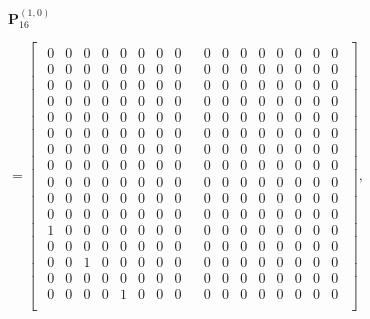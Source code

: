 \documentclass{jtacs}
\numberwithin{equation}{section}
\begin{document}
\begin{center}
$\mathbf{P}_{16}^{(1,0)}$
\begin{adjustbox}{width=0.55\textwidth, margin= 0 0}
$
=\left[
\begin{array}{cc}
\begin{matrix}
0 & 0 & 0 & 0 & 0 & 0 & 0 & 0 \\
0 & 0 & 0 & 0 & 0 & 0 & 0 & 0 \\
0 & 0 & 0 & 0 & 0 & 0 & 0 & 0 \\
0 & 0 & 0 & 0 & 0 & 0 & 0 & 0 \\
0 & 0 & 0 & 0 & 0 & 0 & 0 & 0 \\
0 & 0 & 0 & 0 & 0 & 0 & 0 & 0 \\
0 & 0 & 0 & 0 & 0 & 0 & 0 & 0 \\
0 & 0 & 0 & 0 & 0 & 0 & 0 & 0 \\
0 & 0 & 0 & 0 & 0 & 0 & 0 & 0 \\
0 & 0 & 0 & 0 & 0 & 0 & 0 & 0 \\
0 & 0 & 0 & 0 & 0 & 0 & 0 & 0 \\
1 & 0 & 0 & 0 & 0 & 0 & 0 & 0 \\
0 & 0 & 0 & 0 & 0 & 0 & 0 & 0 \\
0 & 0 & 1 & 0 & 0 & 0 & 0 & 0 \\
0 & 0 & 0 & 0 & 0 & 0 & 0 & 0 \\
0 & 0 & 0 & 0 & 1 & 0 & 0 & 0 \\
\end{matrix}
&
\begin{matrix}
0 & 0 & 0 & 0 & 0 & 0 & 0 & 0 \\
0 & 0 & 0 & 0 & 0 & 0 & 0 & 0 \\
0 & 0 & 0 & 0 & 0 & 0 & 0 & 0 \\
0 & 0 & 0 & 0 & 0 & 0 & 0 & 0 \\
0 & 0 & 0 & 0 & 0 & 0 & 0 & 0 \\
0 & 0 & 0 & 0 & 0 & 0 & 0 & 0 \\
0 & 0 & 0 & 0 & 0 & 0 & 0 & 0 \\
0 & 0 & 0 & 0 & 0 & 0 & 0 & 0 \\
0 & 0 & 0 & 0 & 0 & 0 & 0 & 0 \\
0 & 0 & 0 & 0 & 0 & 0 & 0 & 0 \\
0 & 0 & 0 & 0 & 0 & 0 & 0 & 0 \\
0 & 0 & 0 & 0 & 0 & 0 & 0 & 0 \\
0 & 0 & 0 & 0 & 0 & 0 & 0 & 0 \\
0 & 0 & 0 & 0 & 0 & 0 & 0 & 0 \\
0 & 0 & 0 & 0 & 0 & 0 & 0 & 0 \\
0 & 0 & 0 & 0 & 0 & 0 & 0 & 0 \\
\end{matrix}
\end{array}
\right],
$
\end{adjustbox}\end{center}
\end{document}
